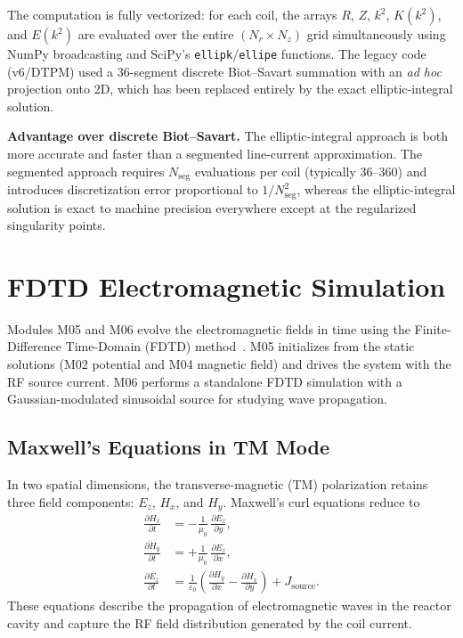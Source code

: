 \documentclass[11pt,a4paper]{report}
\begin{document}
The computation is fully vectorized: for each coil, the arrays $R$, $Z$, $k^2$, $K(k^2)$, and $E(k^2)$ are evaluated over the entire $(N_r \times N_z)$ grid simultaneously using NumPy broadcasting and SciPy's \texttt{ellipk}/\texttt{ellipe} functions.  The legacy code (v6/DTPM) used a 36-segment discrete Biot--Savart summation with an \emph{ad hoc} projection onto 2D, which has been replaced entirely by the exact elliptic-integral solution.

\textbf{Advantage over discrete Biot--Savart.}  The elliptic-integral approach is both more accurate and faster than a segmented line-current approximation.  The segmented approach requires $N_\mathrm{seg}$ evaluations per coil (typically 36--360) and introduces discretization error proportional to $1/N_\mathrm{seg}^2$, whereas the elliptic-integral solution is exact to machine precision everywhere except at the regularized singularity points.


\section{FDTD Electromagnetic Simulation}
\label{sec:m05m06}

Modules M05 and M06 evolve the electromagnetic fields in time using the Finite-Difference Time-Domain (FDTD) method~\cite{Taflove2005,Yee1966}.  M05 initializes from the static solutions (M02 potential and M04 magnetic field) and drives the system with the RF source current.  M06 performs a standalone FDTD simulation with a Gaussian-modulated sinusoidal source for studying wave propagation.

\subsection{Maxwell's Equations in TM Mode}

In two spatial dimensions, the transverse-magnetic (TM) polarization retains three field components: $E_z$, $H_x$, and $H_y$.  Maxwell's curl equations reduce to
\begin{align}
  \frac{\partial H_x}{\partial t} &= -\frac{1}{\mu_0}\,
    \frac{\partial E_z}{\partial y},
    \label{eq:fdtd-hx} \\[4pt]
  \frac{\partial H_y}{\partial t} &= +\frac{1}{\mu_0}\,
    \frac{\partial E_z}{\partial x},
    \label{eq:fdtd-hy} \\[4pt]
  \frac{\partial E_z}{\partial t} &= \frac{1}{\varepsilon_0}\!\left(
    \frac{\partial H_y}{\partial x} - \frac{\partial H_x}{\partial y}
  \right) + J_\mathrm{source}.
    \label{eq:fdtd-ez}
\end{align}
These equations describe the propagation of electromagnetic waves in the reactor cavity and capture the RF field distribution generated by the coil current.
\end{document}
